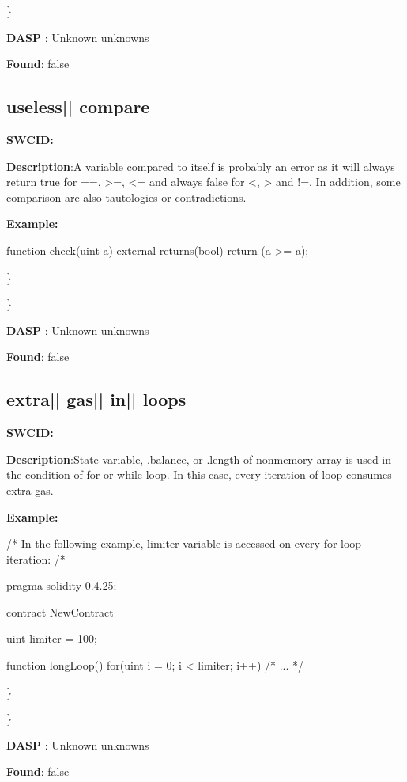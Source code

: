 \documentclass{article}
\begin{document}
\} 

\textbf{DASP} : Unknown unknowns

\textbf{Found}: false

\subsection{useless{|\textunderscore| }compare} 
\textbf{SWC{\textunderscore }ID:} 

\textbf{Description}:A variable compared to itself is probably an error as it will always return true for ==, >=, <= and always false for <, > and !=. In addition, some comparison are also tautologies or contradictions.


\textbf{Example:} 
\begin{ffcode} 

function check(uint a) external returns(bool){
    return (a >= a);
}

\end{ffcode} 
\} 

\} 

\textbf{DASP} : Unknown unknowns

\textbf{Found}: false

\subsection{extra{|\textunderscore| }gas{|\textunderscore| }in{|\textunderscore| }loops} 
\textbf{SWC{\textunderscore }ID:} 

\textbf{Description}:State variable, .balance, or .length of non{\textendash}memory array is used in the condition of for or while loop. In this case, every iteration of loop consumes extra gas.


\textbf{Example:} 
\begin{ffcode} 

/* In the following example, limiter variable is accessed on every for-loop iteration: /* 

pragma solidity 0.4.25;

contract NewContract {
    uint limiter = 100;

    function longLoop() {
        for(uint i = 0; i < limiter; i++) {
            /* ... */
        }
    }
}

\end{ffcode} 
\} 

\} 

\textbf{DASP} : Unknown unknowns

\textbf{Found}: false
\end{document}
